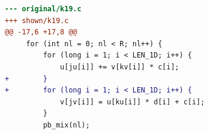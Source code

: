 \begin{lstlisting}[language=diff,basicstyle=\ttfamily\scriptsize,breaklines=true,caption={tsvc_b1/k19 — no-change (e2v3_k19) — shown: a rewrite the gate rejected at 'correctness'}]
--- original/k19.c
+++ shown/k19.c
@@ -17,6 +17,8 @@
     for (int nl = 0; nl < R; nl++) {
         for (long i = 1; i < LEN_1D; i++) {
             u[ju[i]] += v[kv[i]] * c[i];
+        }
+        for (long i = 1; i < LEN_1D; i++) {
             v[jv[i]] = u[ku[i]] * d[i] + c[i];
         }
         pb_mix(nl);
\end{lstlisting}
